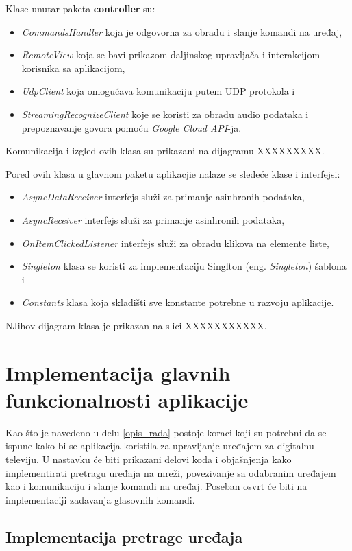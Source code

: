 \documentclass[implementacija.tex]{subfiles}
\begin{document}
Klase unutar paketa \textbf{controller} su:
\begin{itemize}
\item \textit{CommandsHandler} koja je odgovorna za obradu i slanje komandi na uređaj,
\item \textit{RemoteView} koja se bavi prikazom daljinskog upravljača i interakcijom korisnika sa aplikacijom,
\item \textit{UdpClient} koja omogućava komunikaciju putem UDP protokola i
\item \textit{StreamingRecognizeClient} koje se koristi za obradu audio podataka i prepoznavanje govora pomoću \textit{Google Cloud API}-ja. 
\end{itemize}
Komunikacija i izgled ovih klasa su prikazani na dijagramu XXXXXXXXX.

Pored ovih klasa u glavnom paketu aplikacjie nalaze se sledeće klase i interfejsi:
\begin{itemize}
\item \textit{AsyncDataReceiver} interfejs služi za primanje asinhronih podataka,
\item \textit{AsyncReceiver} interfejs služi za primanje asinhronih podataka,
\item \textit{OnItemClickedListener} interfejs služi za obradu klikova na elemente liste,
\item \textit{Singleton} klasa se koristi za implementaciju Singlton (eng. \textit{Singleton}) šablona i
\item \textit{Constants} klasa koja skladišti sve konstante potrebne u razvoju aplikacije.
\end{itemize}
NJihov dijagram klasa je prikazan na slici XXXXXXXXXXX.

\section{Implementacija glavnih funkcionalnosti aplikacije}
Kao što je navedeno u delu \ref{opis_rada} postoje koraci koji su potrebni da se ispune kako bi se aplikacija koristila za upravljanje uređajem za digitalnu televiju. U nastavku će biti prikazani delovi koda i objašnjenja kako implementirati pretragu uređaja na mreži, povezivanje sa odabranim uređajem kao i komunikaciju i slanje komandi na uređaj. Poseban osvrt će biti na implementaciji zadavanja glasovnih komandi. 

\subsection{Implementacija pretrage uređaja}

\end{document}
